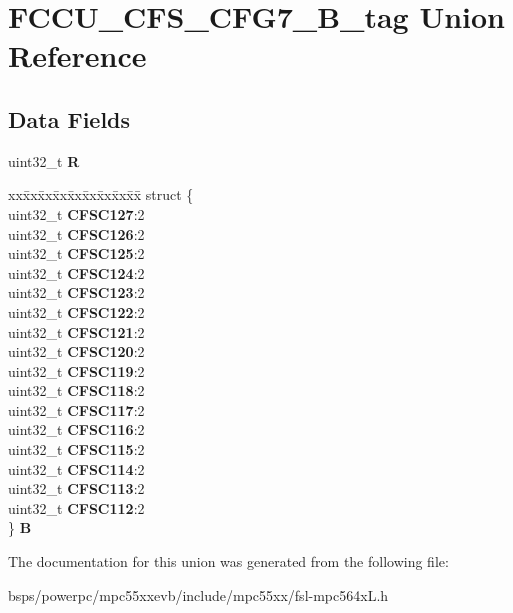 \hypertarget{unionFCCU__CFS__CFG7__32B__tag}{}\section{F\+C\+C\+U\+\_\+\+C\+F\+S\+\_\+\+C\+F\+G7\+\_\+B\+\_\+tag Union Reference}
\label{unionFCCU__CFS__CFG7__32B__tag}
\subsection*{Data Fields}
\begin{DoxyCompactItemize}
\item 
\mbox{\label{unionFCCU__CFS__CFG7__32B__tag_a311a1a017f38f8304c411f1dd4c8dd19}} 
uint32\+\_\+t {\bfseries R}
\item 
\mbox{\label{unionFCCU__CFS__CFG7__32B__tag_ae47663c2ba36f85b532ba36901d55dde}} 
\begin{tabbing}
xx\=xx\=xx\=xx\=xx\=xx\=xx\=xx\=xx\=\kill
struct \{\\
\>uint32\_t {\bfseries CFSC127}:2\\
\>uint32\_t {\bfseries CFSC126}:2\\
\>uint32\_t {\bfseries CFSC125}:2\\
\>uint32\_t {\bfseries CFSC124}:2\\
\>uint32\_t {\bfseries CFSC123}:2\\
\>uint32\_t {\bfseries CFSC122}:2\\
\>uint32\_t {\bfseries CFSC121}:2\\
\>uint32\_t {\bfseries CFSC120}:2\\
\>uint32\_t {\bfseries CFSC119}:2\\
\>uint32\_t {\bfseries CFSC118}:2\\
\>uint32\_t {\bfseries CFSC117}:2\\
\>uint32\_t {\bfseries CFSC116}:2\\
\>uint32\_t {\bfseries CFSC115}:2\\
\>uint32\_t {\bfseries CFSC114}:2\\
\>uint32\_t {\bfseries CFSC113}:2\\
\>uint32\_t {\bfseries CFSC112}:2\\
\} {\bfseries B}\\

\end{tabbing}\end{DoxyCompactItemize}


The documentation for this union was generated from the following file\+:\begin{DoxyCompactItemize}
\item 
bsps/powerpc/mpc55xxevb/include/mpc55xx/fsl-\/mpc564x\+L.\+h\end{DoxyCompactItemize}

